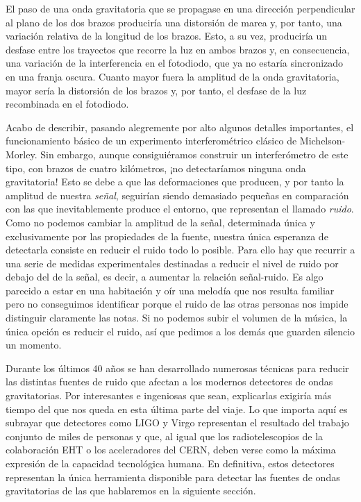 El paso de una onda gravitatoria que se propagase en una dirección perpendicular al plano de los dos brazos produciría una distorsión de marea y, por tanto, una variación relativa de la longitud de los brazos. Esto, a su vez, produciría un desfase entre los trayectos que recorre la luz en ambos brazos y, en consecuencia, una variación de la interferencia en el fotodiodo, que ya no estaría sincronizado en una franja oscura. Cuanto mayor fuera la amplitud de la onda gravitatoria, mayor sería la distorsión de los brazos y, por tanto, el desfase de la luz recombinada en el fotodiodo.

Acabo de describir, pasando alegremente por alto algunos detalles importantes, el funcionamiento básico de un experimento interferométrico clásico de Michelson-Morley. Sin embargo, aunque consiguiéramos construir un interferómetro de este tipo, con brazos de cuatro kilómetros, ¡no detectaríamos ninguna onda gravitatoria! Esto se debe a que las deformaciones que producen, y por tanto la amplitud de nuestra \emph{señal}, seguirían siendo demasiado pequeñas en comparación con las que inevitablemente produce el entorno, que representan el llamado \emph{ruido}. Como no podemos cambiar la amplitud de la señal, determinada única y exclusivamente por las propiedades de la fuente, nuestra única esperanza de detectarla consiste en reducir el ruido todo lo posible. Para ello hay que recurrir a una serie de medidas experimentales destinadas a reducir el nivel de ruido por debajo del de la señal, es decir, a aumentar la relación señal-ruido. Es algo parecido a estar en una habitación y oír una melodía que nos resulta familiar pero no conseguimos identificar porque el ruido de las otras personas nos impide distinguir claramente las notas. Si no podemos subir el volumen de la música, la única opción es reducir el ruido, así que pedimos a los demás que guarden silencio un momento.

Durante los últimos 40 años se han desarrollado numerosas técnicas para reducir las distintas fuentes de ruido que afectan a los modernos detectores de ondas gravitatorias. Por interesantes e ingeniosas que sean, explicarlas exigiría más tiempo del que nos queda en esta última parte del viaje. Lo que importa aquí es subrayar que detectores como LIGO y Virgo representan el resultado del trabajo conjunto de miles de personas y que, al igual que los radiotelescopios de la colaboración EHT o los aceleradores del CERN, deben verse como la máxima expresión de la capacidad tecnológica humana. En definitiva, estos detectores representan la única herramienta disponible para detectar las fuentes de ondas gravitatorias de las que hablaremos en la siguiente sección.

